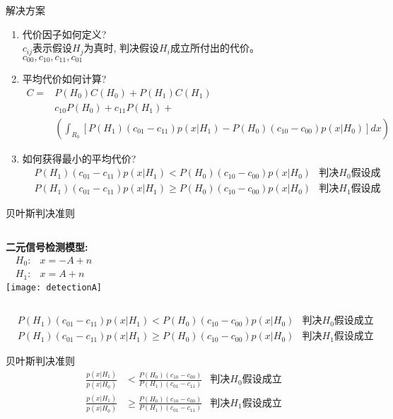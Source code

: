\begin{frame}{解决方案}
\begin{enumerate}
	\item 代价因子如何定义? \\
	$c_{ij}$表示假设$H_j$为真时, 判决假设$H_i$成立所付出的代价。\\
	$c_{00}, c_{10}, c_{11}, c_{01}$
	\item 平均代价如何计算?
	\begin{align*}
	C=&P(H_0)C(H_0)+P(H_1)C(H_1)\\
	&c_{10}P(H_0)+c_{11}P(H_1)+\\
	&\left(\int_{R_0}\left[P({H_1})(c_{01}-c_{11})p(x|H_1)-P(H_0)(c_{10}-c_{00})p(x|H_0)\right]dx \right)
	\end{align*}
	\item 如何获得最小的平均代价?
	\begin{align*}
	&P({H_1})(c_{01}-c_{11})p(x|H_1)< P(H_0)(c_{10}-c_{00})p(x|H_0)&\textbf{判决$H_0$假设成立}\\
	&P({H_1})(c_{01}-c_{11})p(x|H_1)\ge P(H_0)(c_{10}-c_{00})p(x|H_0)&\textbf{判决$H_1$假设成立}
	\end{align*}
\end{enumerate}
\end{frame}

\begin{frame}[shrink]{贝叶斯判决准则}
\begin{columns}%
	\textbf{二元信号检测模型:}
	\begin{align*}
	H_0: &x=-A+n\\
	H_1: &x=A+n
	\end{align*}
	\texttt{[image: detectionA]}
\end{columns}
\begin{align*}
&P({H_1})(c_{01}-c_{11})p(x|H_1)< P(H_0)(c_{10}-c_{00})p(x|H_0)&\textbf{判决$H_0$假设成立}\\
&P({H_1})(c_{01}-c_{11})p(x|H_1)\ge P(H_0)(c_{10}-c_{00})p(x|H_0)&\textbf{判决$H_1$假设成立}
\end{align*}
\begin{block}{贝叶斯判决准则}
	\begin{align*}
	\frac{p(x|H_1)}{p(x|H_0)}&<\frac{P(H_0)(c_{10}-c_{00})}{P(H_1)(c_{01}-c_{11})}&\textbf{判决$H_0$假设成立}\\
	\frac{p(x|H_1)}{p(x|H_0)}&\ge\frac{P(H_0)(c_{10}-c_{00})}{P(H_1)(c_{01}-c_{11})}&\textbf{判决$H_1$假设成立}
	\end{align*}
\end{block}
\end{frame}

